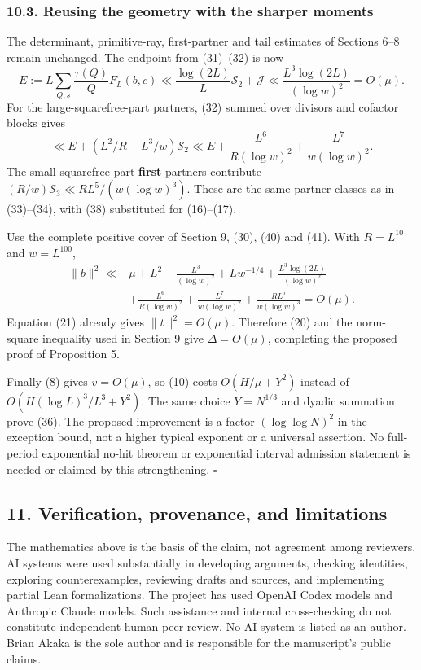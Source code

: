 \documentclass[
  english,
  11pt,
]{article}
\begin{document}
\subsubsection{10.3. Reusing the geometry with the sharper
moments}\label{reusing-the-geometry-with-the-sharper-moments}

The determinant, primitive-ray, first-partner and tail estimates of
Sections 6--8 remain unchanged. The endpoint from (31)--(32) is now \[
E:=L\sum_{Q,s}\frac{\tau(Q)}QF_L(b,c)
\ll\frac{\log(2L)}L\mathcal S_2+\mathcal J
\ll\frac{L^3\log(2L)}{(\log w)^2}=O(\mu). \tag{41}
\] For the large-squarefree-part partners, (32) summed over divisors and
cofactor blocks gives \[
\ll E+(L^2/R+L^3/w)\mathcal S_2
\ll E+\frac{L^6}{R(\log w)^2}+\frac{L^7}{w(\log w)^2}.
\] The small-squarefree-part \textbf{first} partners contribute
\((R/w)\mathcal S_3\ll RL^5/(w(\log w)^3)\). These are the same partner
classes as in (33)--(34), with (38) substituted for (16)--(17).

Use the complete positive cover of Section 9, (30), (40) and (41). With
\(R=L^{10}\) and \(w=L^{100}\), \[
\begin{split}
\|b\|^2\ll{}&\mu+L^2+\frac{L^3}{(\log w)^2}+Lw^{-1/4}
+\frac{L^3\log(2L)}{(\log w)^2}\\
&+\frac{L^6}{R(\log w)^2}+\frac{L^7}{w(\log w)^2}
+\frac{RL^5}{w(\log w)^3}=O(\mu).
\end{split} \tag{42}
\] Equation (21) already gives \(\|t\|^2=O(\mu)\). Therefore (20) and
the norm-square inequality used in Section 9 give \(\Delta=O(\mu)\),
completing the proposed proof of Proposition 5.

Finally (8) gives \(v=O(\mu)\), so (10) costs \(O(H/\mu+Y^2)\) instead
of \(O(H(\log L)^3/L^3+Y^2)\). The same choice \(Y=N^{1/3}\) and dyadic
summation prove (36). The proposed improvement is a factor
\((\log\log N)^2\) in the exception bound, not a higher typical exponent
or a universal assertion. No full-period exponential no-hit theorem or
exponential interval admission statement is needed or claimed by this
strengthening. \(\square\)

\subsection{11. Verification, provenance, and
limitations}\label{verification-provenance-and-limitations}

The mathematics above is the basis of the claim, not agreement among
reviewers. AI systems were used substantially in developing arguments,
checking identities, exploring counterexamples, reviewing drafts and
sources, and implementing partial Lean formalizations. The project has
used OpenAI Codex models and Anthropic Claude models. Such assistance
and internal cross-checking do not constitute independent human peer
review. No AI system is listed as an author. Brian Akaka is the sole
author and is responsible for the manuscript's public claims.
\end{document}
